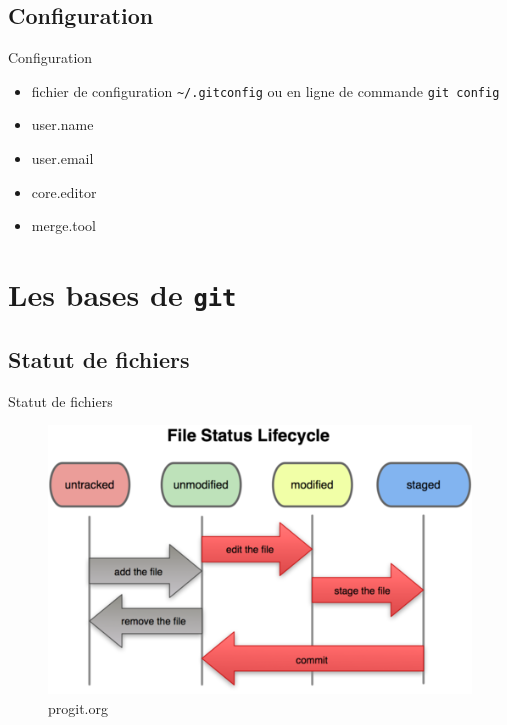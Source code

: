\documentclass{beamer}
\newcommand{\git}{\texttt{git}}
\begin{document}
\subsection*{Configuration}
\begin{frame}[containsverbatim]{Configuration}
  \begin{itemize}
  \item fichier de configuration \lstinline|~/.gitconfig| ou en ligne de commande \lstinline|git config|
  \item user.name
  \item user.email
  \item core.editor
  \item merge.tool
  \end{itemize}
\end{frame}

\section{Les bases de \git}
\subsection*{Statut de fichiers}
\begin{frame}{Statut de fichiers}
  \begin{figure}
    \begin{center}
      \includegraphics[scale=0.7]{img/Status_lifecycle.png}
    \end{center}
    \caption{progit.org}
  \end{figure}
\end{frame}
\end{document}
